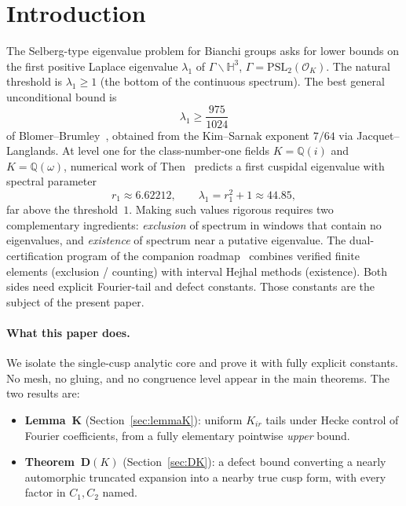 \documentclass[11pt]{amsart}
\theoremstyle{definition}
\newcommand{\HH}{\mathbb{H}^3}
\newcommand{\QQ}{\mathbb{Q}}
\newcommand{\PSL}{\mathrm{PSL}}
\newcommand{\OK}{\mathcal{O}_K}
\begin{document}
\tableofcontents

\section{Introduction}
\label{sec:intro}

The Selberg-type eigenvalue problem for Bianchi groups asks for lower
bounds on the first positive Laplace eigenvalue $\lambda_1$ of
$\Gamma\backslash\HH$, $\Gamma=\PSL_2(\OK)$.  The natural threshold is
$\lambda_1\ge 1$ (the bottom of the continuous spectrum).  The best
general unconditional bound is
\[
  \lambda_1 \ge \frac{975}{1024}
\]
of Blomer--Brumley~\cite{BB11}, obtained from the Kim--Sarnak exponent
$7/64$ via Jacquet--Langlands.  At level one for the class-number-one
fields $K=\QQ(i)$ and $K=\QQ(\omega)$, numerical work of Then~\cite{Then}
predicts a first cuspidal eigenvalue with spectral parameter
\[
  r_1 \approx 6.62212,\qquad \lambda_1 = r_1^2+1 \approx 44.85,
\]
far above the threshold~$1$.  Making such values rigorous requires two
complementary ingredients: \emph{exclusion} of spectrum in windows that
contain no eigenvalues, and \emph{existence} of spectrum near a putative
eigenvalue.  The dual-certification program of the companion
roadmap~\cite{DualRoadmap} combines verified finite elements (exclusion /
counting) with interval Hejhal methods (existence).  Both sides need
explicit Fourier-tail and defect constants.  Those constants are the
subject of the present paper.

\paragraph{What this paper does.}
We isolate the single-cusp analytic core and prove it with fully
explicit constants.  No mesh, no gluing, and no congruence level appear
in the main theorems.  The two results are:

\begin{itemize}[leftmargin=*]
\item \textbf{Lemma~K} (Section~\ref{sec:lemmaK}): uniform $K_{ir}$ tails
under Hecke control of Fourier coefficients, from a fully elementary
pointwise \emph{upper} bound.
\item \textbf{Theorem~D$(K)$} (Section~\ref{sec:DK}): a defect bound
converting a nearly automorphic truncated expansion into a nearby true
cusp form, with every factor in $C_1,C_2$ named.
\end{itemize}
\end{document}
